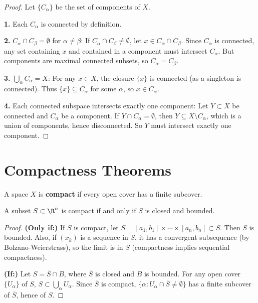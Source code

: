 \begin{proof}
Let $\{C_\alpha\}$ be the set of components of $X$.

\textbf{1.} Each $C_\alpha$ is connected by definition.

\textbf{2.} $C_\alpha \cap C_\beta = \emptyset$ for $\alpha \neq \beta$:
If $C_\alpha \cap C_\beta \neq \emptyset$, let $x \in C_\alpha \cap C_\beta$. Since $C_\alpha$ is connected, any set containing $x$ and contained in a component must intersect $C_\alpha$. But components are maximal connected subsets, so $C_\alpha = C_\beta$.

\textbf{3.} $\bigcup_\alpha C_\alpha = X$: For any $x \in X$, the closure $\overline{\{x\}}$ is connected (as a singleton is connected). Thus $\overline{\{x\}} \subseteq C_\alpha$ for some $\alpha$, so $x \in C_\alpha$.

\textbf{4.} Each connected subspace intersects exactly one component: Let $Y \subset X$ be connected and $C_\alpha$ be a component. If $Y \cap C_\alpha = \emptyset$, then $Y \subseteq X \setminus C_\alpha$, which is a union of components, hence disconnected. So $Y$ must intersect exactly one component.
\end{proof}

\section{Compactness Theorems}
\label{sec:compactness-theorems}

A space $X$ is \textbf{compact} if every open cover has a finite subcover.

\begin{theorem}
\label{thm:heine-borel}
A subset $S \subset \R^n$ is compact if and only if $S$ is closed and bounded.
\end{theorem}

\begin{proof}
\textbf{(Only if:) } If $S$ is compact, let $S = [a_1, b_1] \times \cdots \times [a_n, b_n] \subset S$. Then $S$ is bounded. Also, if $(x_k)$ is a sequence in $S$, it has a convergent subsequence (by Bolzano-Weierstrass), so the limit is in $S$ (compactness implies sequential compactness).

\textbf{(If:) } Let $S = \overline{S} \cap B$, where $\overline{S}$ is closed and $B$ is bounded. For any open cover $\{U_\alpha\}$ of $S$, $S \subset \bigcup_\alpha U_\alpha$. Since $\overline{S}$ is compact, $\{\alpha : U_\alpha \cap \overline{S} \neq \emptyset\}$ has a finite subcover of $\overline{S}$, hence of $S$.
\end{proof}

